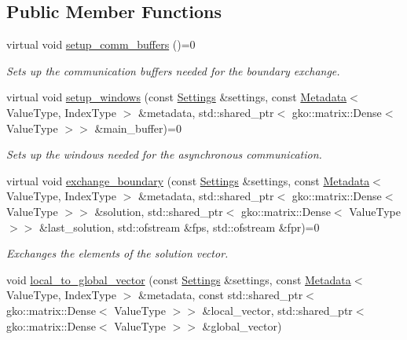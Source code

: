 \subsection*{Public Member Functions}
\begin{DoxyCompactItemize}
\item 
\mbox{\label{classschwz_1_1Communicate_ad77bbc19111a7b6ff79962d3a659a2cc}} 
virtual void \hyperlink{classschwz_1_1Communicate_ad77bbc19111a7b6ff79962d3a659a2cc}{setup\+\_\+comm\+\_\+buffers} ()=0
\begin{DoxyCompactList}\small\item\em Sets up the communication buffers needed for the boundary exchange. \end{DoxyCompactList}\item 
virtual void \hyperlink{classschwz_1_1Communicate_ab41e8e19e90ce2d53234cbec2cdb3b38}{setup\+\_\+windows} (const \hyperlink{structschwz_1_1Settings}{Settings} \&settings, const \hyperlink{structschwz_1_1Metadata}{Metadata}$<$ Value\+Type, Index\+Type $>$ \&metadata, std\+::shared\+\_\+ptr$<$ gko\+::matrix\+::\+Dense$<$ Value\+Type $>$$>$ \&main\+\_\+buffer)=0
\begin{DoxyCompactList}\small\item\em Sets up the windows needed for the asynchronous communication. \end{DoxyCompactList}\item 
virtual void \hyperlink{classschwz_1_1Communicate_a40f61bcdae9d4d6a12091929944635a4}{exchange\+\_\+boundary} (const \hyperlink{structschwz_1_1Settings}{Settings} \&settings, const \hyperlink{structschwz_1_1Metadata}{Metadata}$<$ Value\+Type, Index\+Type $>$ \&metadata, std\+::shared\+\_\+ptr$<$ gko\+::matrix\+::\+Dense$<$ Value\+Type $>$$>$ \&solution, std\+::shared\+\_\+ptr$<$ gko\+::matrix\+::\+Dense$<$ Value\+Type $>$$>$ \&last\+\_\+solution, std\+::ofstream \&fps, std\+::ofstream \&fpr)=0
\begin{DoxyCompactList}\small\item\em Exchanges the elements of the solution vector. \end{DoxyCompactList}\item 
void \hyperlink{classschwz_1_1Communicate_af951ced18d73fb0a8c81713fd87422fe}{local\+\_\+to\+\_\+global\+\_\+vector} (const \hyperlink{structschwz_1_1Settings}{Settings} \&settings, const \hyperlink{structschwz_1_1Metadata}{Metadata}$<$ Value\+Type, Index\+Type $>$ \&metadata, const std\+::shared\+\_\+ptr$<$ gko\+::matrix\+::\+Dense$<$ Value\+Type $>$$>$ \&local\+\_\+vector, std\+::shared\+\_\+ptr$<$ gko\+::matrix\+::\+Dense$<$ Value\+Type $>$$>$ \&global\+\_\+vector)
$$
\end{DoxyCompactItemize}
